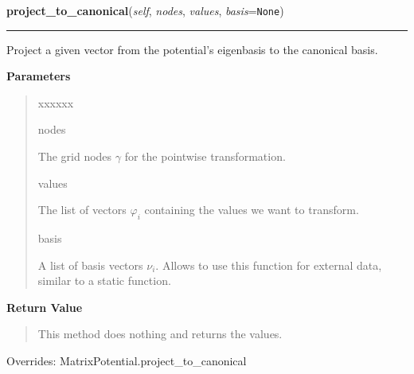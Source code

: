 \hspace{.8\funcindent}\begin{boxedminipage}{\funcwidth}

    \raggedright \textbf{project\_to\_canonical}(\textit{self}, \textit{nodes}, \textit{values}, \textit{basis}={\tt None})

    \vspace{-1.5ex}

    \rule{\textwidth}{0.5\fboxrule}
\setlength{\parskip}{2ex}
    Project a given vector from the potential's eigenbasis to the canonical
    basis.

\setlength{\parskip}{1ex}
      \textbf{Parameters}
      \vspace{-1ex}

      \begin{quote}
        \begin{Ventry}{xxxxxx}

          \item[nodes]

          The grid nodes $\gamma$ for the pointwise
          transformation.

          \item[values]

          The list of vectors $\varphi_i$ containing the values we want
          to transform.

          \item[basis]

          A list of basis vectors $\nu_i$. Allows to use this function
          for external data, similar to a static function.

        \end{Ventry}

      \end{quote}

      \textbf{Return Value}
    \vspace{-1ex}

      \begin{quote}
      This method does nothing and returns the values.

      \end{quote}

      Overrides: MatrixPotential.project\_to\_canonical

    \end{boxedminipage}

    \vspace{0.5ex}

